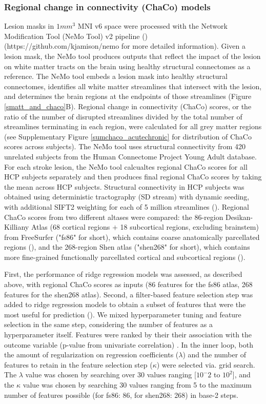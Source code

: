 \documentclass[10pt]{article}
\def\Plus{\texttt{+}}
\begin{document}
\subsubsection*{Regional change in connectivity (ChaCo) models}
Lesion masks in $1mm^3$ MNI v6 space were processed with the Network Modification Tool (NeMo Tool) v2 pipeline (\cite{Kuceyeski2013-nk}) (https://github.com/kjamison/nemo for more detailed information). Given a lesion mask, the NeMo tool produces outputs that reflect the impact of the lesion on white matter tracts on the brain using healthy structural connectomes as a reference. The NeMo tool embeds a lesion mask into healthy structural connectomes, identifies all white matter streamlines that intersect with the lesion, and determines the brain regions at the endpoints of those streamlines (Figure \ref{smatt_and_chaco}B). Regional change in connectivity (ChaCo) scores, or the ratio of the number of disrupted streamlines divided by the total number of streamlines terminating in each region, were calculated for all grey matter regions (see Supplementary Figure \ref{sumchaco_acutechronic} for distribution of ChaCo scores across subjects). The NeMo tool uses structural connectivity from 420 unrelated subjects from the Human Connectome Project Young Adult database. For each stroke lesion, the NeMo tool calcualtes regional ChaCo scores for all HCP subjects separately and then produces final regional ChaCo scores by taking the mean across HCP subjects. Structural connectivity in HCP subjects was obtained using deterministic tractography (SD stream) with dynamic seeding, with additional SIFT2 weighting for each of 5 million streamlines (\cite{Smith2015-eb}). Regional ChaCo scores from two different altases were compared: the 86-region Desikan-Killiany Atlas (68 cortical regions $\Plus$ 18 subcortical regions, excluding brainstem) from FreeSurfer ("fs86" for short), which contains coarse anatomically parcellated regions (\cite{Desikan2006-vf,Fischl2002-lb}), and the 268-region Shen atlas ("shen268" for short), which contains more fine-grained functionally parcellated cortical and subcortical regions (\cite{Shen2013-zn}).

First, the performance of ridge regression models was assessed, as described above, with regional ChaCo scores as inputs (86 features for the fs86 atlas, 268 features for the shen268 atlas). Second, a filter-based feature selection step was added to ridge regression models to obtain a subset of features that were the most useful for prediction (\cite{Guyon2003-kj, Hall1999-qr, Pudjihartono2022-zg}). We mixed hyperparameter tuning and feature selection in the same step, considering the number of features as a hyperparameter itself. Features were ranked by their their association with the outcome variable (p-value from univariate correlation) . In the inner loop, both the amount of regularization on regression coefficients ($\lambda$) and the number of features to retain in the feature selection step ($\kappa$) were selected via. grid search. The $\lambda$ value was chosen by searching over 30 values ranging [$10^-2$ to $10^2$], and the $\kappa$ value was chosen by searching 30 values ranging from 5 to the maximum number of features possible (for fs86: 86, for shen268: 268) in base-2 steps. 
\end{document}
